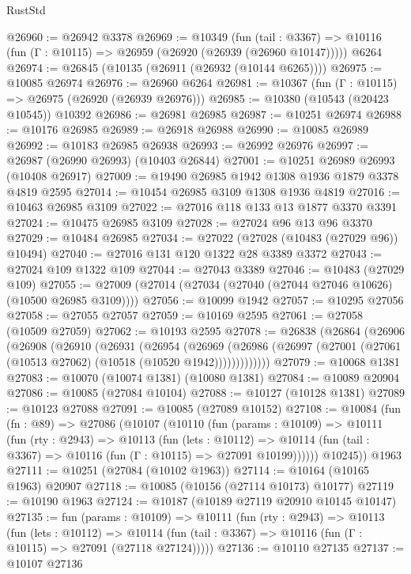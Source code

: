 \begin{lexlean}{RustStd}
\begin{coremodule}
@26960 := @26942 @3378
@26969 := @10349
    (fun (tail : @3367) => @10116 (fun (Γ : @10115) => @26959 (@26920 (@26939 (@26960 @10147)))))
    @6264
@26974 := @26845 (@10135 (@26911 (@26932 (@10144 @6265))))
@26975 := @10085 @26974
@26976 := @26960 @6264
@26981 := @10367 (fun (Γ : @10115) => @26975 (@26920 (@26939 @26976)))
@26985 := @10380 (@10543 (@20423 @10545)) @10392
@26986 := @26981 @26985
@26987 := @10251 @26974
@26988 := @10176 @26985
@26989 := @26918 @26988
@26990 := @10085 @26989
@26992 := @10183 @26985 @26938
@26993 := @26992 @26976
@26997 := @26987 (@26990 @26993) (@10403 @26844)
@27001 := @10251 @26989 @26993 (@10408 @26917)
@27009 := @19490 @26985 @1942 @1308 @1936 @1879 @3378 @4819 @2595
@27014 := @10454 @26985 @3109 @1308 @1936 @4819
@27016 := @10463 @26985 @3109
@27022 := @27016 @118 @133 @13 @1877 @3370 @3391
@27024 := @10475 @26985 @3109
@27028 := @27024 @96 @13 @96 @3370
@27029 := @10484 @26985
@27034 := @27022 (@27028 (@10483 (@27029 @96)) @10494)
@27040 := @27016 @131 @120 @1322 @28 @3389 @3372
@27043 := @27024 @109 @1322 @109
@27044 := @27043 @3389
@27046 := @10483 (@27029 @109)
@27055 := @27009 (@27014 (@27034 (@27040 (@27044 @27046 @10626) (@10500 @26985 @3109))))
@27056 := @10099 @1942
@27057 := @10295 @27056
@27058 := @27055 @27057
@27059 := @10169 @2595
@27061 := @27058 (@10509 @27059)
@27062 := @10193 @2595
@27078 := @26838
    (@26864
      (@26906
        (@26908
          (@26910
            (@26931
              (@26954
                (@26969
                  (@26986 (@26997 (@27001 (@27061 (@10513 @27062) (@10518 (@10520 @1942)))))))))))))
@27079 := @10068 @1381
@27083 := @10070 (@10074 @1381) (@10080 @1381)
@27084 := @10089 @20904
@27086 := @10085 (@27084 @10104)
@27088 := @10127 (@10128 @1381)
@27089 := @10123 @27088
@27091 := @10085 (@27089 @10152)
@27108 := @10084
    (fun (fn : @89) =>
    @27086
      (@10107
        (@10110
          (fun (params : @10109) =>
          @10111
            (fun (rty : @2943) =>
            @10113
              (fun (lets : @10112) =>
              @10114 (fun (tail : @3367) => @10116 (fun (Γ : @10115) => @27091 @10199))))))
        @10245))
    @1963
@27111 := @10251 (@27084 (@10102 @1963))
@27114 := @10164 (@10165 @1963) @20907
@27118 := @10085 (@10156 (@27114 @10173) @10177)
@27119 := @10190 @1963
@27124 := @10187 (@10189 @27119 @20910 @10145 @10147)
@27135 := fun (params : @10109) =>
  @10111
    (fun (rty : @2943) =>
    @10113
      (fun (lets : @10112) =>
      @10114 (fun (tail : @3367) => @10116 (fun (Γ : @10115) => @27091 (@27118 @27124)))))
@27136 := @10110 @27135
@27137 := @10107 @27136

\end{coremodule}
\end{lexlean}
